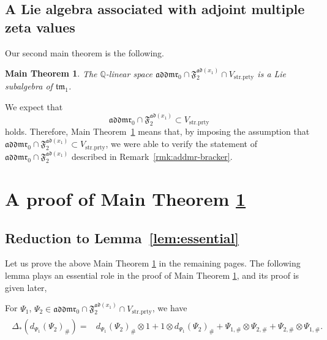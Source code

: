 \documentclass[15pt,oneside,reqno]{amsart}
\newtheorem{mt}{Main Theorem}
\theoremstyle{remark}{
\newtheorem{lem}[df]{Lemma}
\newtheorem{prop}[df]{Proposition}
\newtheorem{ex}[df]{Example}
\newtheorem{rmk}[df]{Remark}
}
\newcommand{\Q}{\mathbb{Q}}
\newcommand{\addmr}{\mathfrak{addmr}}
\newcommand{\ad}{\mathfrak{ad}}
\newcommand{\tm}{\mathfrak{tm}}
\newcommand{\Fad}{\mathfrak{F}_2^{\ad(x_1)}}
\newcommand{\strprty}{\mathrm{str.prty}}
\begin{document}
\subsection{A Lie algebra associated with adjoint multiple zeta values}

Our second main theorem is the following.
\begin{mt}\label{mt:addmr-Lie}
The $\Q$-linear space $\addmr_0 \cap \Fad \cap V_{\strprty}$ is a Lie subalgebra of $\tm_1$.
\end{mt}

\begin{rmk}
We expect that 
\[
\addmr_0\cap \Fad \subset V_{\strprty}
\]
holds.
Therefore, Main Theorem~\ref{mt:addmr-Lie} means that, by imposing the assumption that $\addmr_0\cap \Fad \subset V_{\strprty}$, we were able to verify the statement of $\addmr_0 \cap \Fad$ described in Remark~\ref{rmk:addmr-bracker}.
\end{rmk}

\section{A proof of Main Theorem \ref{mt:addmr-Lie}}

\subsection{Reduction to Lemma~\ref{lem:essential}}

Let us prove the above Main Theorem \ref{mt:addmr-Lie} in the remaining pages.
The following lemma plays an essential role in the proof of Main Theorem \ref{mt:addmr-Lie}, and its proof is given later,

\begin{lem}\label{lem:essential}
For $\Psi_1$, $\Psi_2 \in \addmr_0 \cap \Fad \cap V_{\strprty}$, we have
\begin{align}
\begin{aligned}
\Delta_*(d_{\Psi_1}(\Psi_2)_{\#}) =&
d_{\Psi_1}(\Psi_2)_{\#} \otimes 1 + 1\otimes d_{\Psi_1}(\Psi_2)_{\#} + \Psi_{1,\#} \otimes  \Psi_{2,\#}  + \Psi_{2,\#} \otimes  \Psi_{1,\#}.  
\end{aligned}  \label{eq:essential}
\end{align}
\end{lem}
\end{document}
